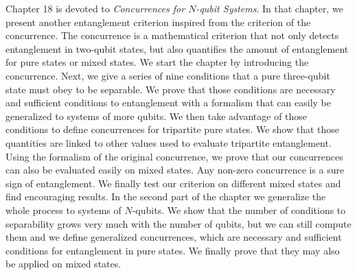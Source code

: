 Chapter 18 is devoted to \textit{Concurrences for $N$-qubit Systems}. In that chapter, we present another entanglement criterion inspired from the criterion of the concurrence. The concurrence is a mathematical criterion that not only detects entanglement in two-qubit states, but also quantifies the amount of entanglement for pure states or mixed states. We start the chapter by introducing the concurrence. Next, we give a series of nine conditions that a pure three-qubit state must obey to be separable. We prove that those conditions are necessary and sufficient conditions to entanglement with a formalism that can easily be generalized to systems of more qubits. We then take advantage of those conditions to define concurrences for tripartite pure states. We show that those quantities are linked to other values used to evaluate tripartite entanglement. Using the formalism of the original concurrence, we prove that our concurrences can also be evaluated easily on mixed states. Any non-zero concurrence is a sure sign of entanglement. We finally test our criterion on different mixed states and find encouraging results. In the second part of the chapter we generalize the whole process to systems of $N$-qubits. We show that the number of conditions to separability grows very much with the number of qubits, but we can still compute them and we define generalized concurrences, which are necessary and sufficient conditions for entanglement in pure states. We finally prove that they may also be applied on mixed states.

